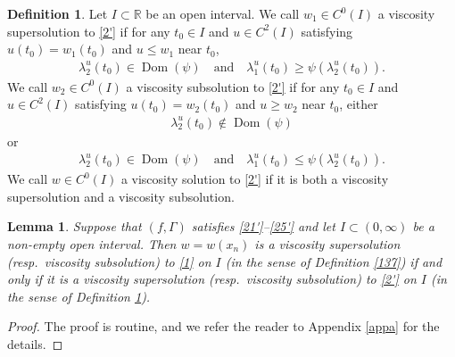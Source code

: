 \documentclass[12pt]{article}
\numberwithin{equation}{section}
\theoremstyle{plain}
\newtheorem{lem}[thm]{Lemma}
\theoremstyle{definition}
\newtheorem{defn}[thm]{Definition}
\begin{document}
\begin{defn}\label{138}
	Let $I\subset\mathbb{R}$ be an open interval. We call $w_1\in C^0(I)$ a viscosity supersolution to \eqref{2'} if for any $t_0\in I$ and $u\in C^2(I)$ satisfying $u(t_0) = w_1(t_0)$ and $u \leq w_1$ near $t_0$,
	\begin{align}\label{126}
	\lambda_2^u(t_0) \in \operatorname{Dom}(\psi)\quad \text{and} \quad \lambda_1^u(t_0) \geq \psi(\lambda_2^u(t_0)). 
	\end{align}
	We call $w_2\in C^0(I)$ a viscosity subsolution to \eqref{2'} if for any $t_0\in I$ and $u\in C^2(I)$ satisfying $u(t_0) = w_2(t_0)$ and $u \geq w_2$ near $t_0$, either 
	\begin{align}\label{135}
	\lambda_2^u(t_0)  \not\in \operatorname{Dom}(\psi) 
	\end{align}
	or 
	\begin{align}\label{136}
	\lambda_2^u(t_0) \in \operatorname{Dom}(\psi) \quad \text{and} \quad \lambda_1^u(t_0) \leq \psi(\lambda_2^u(t_0)). 
	\end{align}
	We call $w\in C^0(I)$ a viscosity solution to \eqref{2'} if it is both a viscosity supersolution and a viscosity subsolution.
\end{defn}


\begin{lem}\label{600}
	Suppose that $(f,\Gamma)$ satisfies \eqref{21'}--\eqref{25'} and let $I\subset(0,\infty)$ be a non-empty open interval. Then $w=w(x_n)$ is a viscosity supersolution (resp.~viscosity subsolution) to \eqref{1} on $I$ (in the sense of Definition \ref{137}) if and only if it is a viscosity supersolution (resp.~viscosity subsolution) to \eqref{2'} on $I$ (in the sense of Definition \ref{138}). 
\end{lem}

\begin{proof}
		The proof is routine, and we refer the reader to Appendix \ref{appa} for the details.
\end{proof}
\end{document}
